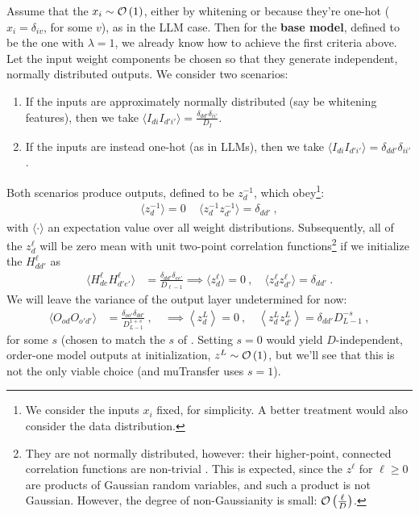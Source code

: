 Assume that the $ x _{i  } \sim \mathcal{O} \left( 1 \right)  $, either by whitening or because they're
one-hot ($ x_{ i }=\delta_{ iv } $, for some $ v $), as in the LLM case. Then for the \textbf{base
model}, defined to be the one with $ \lambda =1 $, we already know how to achieve the first criteria
above. Let the input weight components be chosen so that they generate independent, normally
distributed outputs. We consider two scenarios:
\begin{enumerate}
    \item If the inputs are approximately normally distributed (say be whitening
        features), then we take $ \langle  I_{ d i }I_{ d'i' } \rangle  =  \frac{ \delta_{ dd'
        }\delta _{ ii' } }{ D_{ I } } $.
    \item If the inputs are instead one-hot (as in LLMs), then we take $ \langle  I_{ d i
        }I_{ d'i' } \rangle  =   \delta_{ dd' }\delta _{ ii' } $.
\end{enumerate}
Both scenarios produce outputs, defined to be $ z^{ -1 }_{ d } $, which obey\footnote{We consider
the inputs $ x_{ i } $ fixed, for simplicity. A better treatment would also consider the data
distribution.}:
\begin{align}
    \langle z^{  -1 }_{ d } \rangle=0 \, \quad  \langle z^{  -1 }_{ d }z^{ -1 }_{ d'} \rangle  = \delta_{ dd' }\ ,
\end{align}
with $ \langle \cdot  \rangle $ an expectation value over all weight distributions. Subsequently,
all of the $ z^{ \ell }_{ d } $ will be zero mean with unit two-point correlation
functions\footnote{They are not normally distributed, however: their higher-point, connected
    correlation functions are non-trivial \cite{physicalDL}. This is expected, since the $ z^{ \ell
    }  $ for $ \ell \ge 0 $ are products of Gaussian random variables, and such a product is not
Gaussian. However, the degree of non-Gaussianity is small: $ \mathcal{O} \left( \frac{ \ell }{ D } \right)
$.} if we initialize the $ H^{ \ell }_{ dd' } $ as
\begin{align}
    \langle H^{ \ell }_{ de }H^{ \ell }_{ d'e' } \rangle &=\frac{ \delta _{ dd' }\delta _{ ee' } }{
    D_{ \ell-1 } } \implies \langle z^{\ell}_{ d } \rangle =0 \ , \quad \langle z^{\ell}_{ d }z^{ \ell }_{ d'} \rangle  = \delta_{ dd' } \ .
\end{align}
We will leave the variance of the output layer undetermined for now:
\begin{align}
    \langle O _{ od }O_{ o'd' } \rangle &= \frac{ \delta _{ oo' }\delta _{ dd' } }{ D_{ L-1 }^{ 1+s } }
    \ , \quad \implies \left\langle z^{ L }_{ d } \right\rangle= 0 \ , \quad \left\langle z^{ L }_{ d }z^{ L }_{ d' } \right\rangle= \delta_{ dd' }D_{ L-1 }^{ -s } \ ,
\end{align}
for some $ s $ (chosen to match the $ s $ of
\cite{yaida2022metaprincipledfamilyhyperparameterscaling}. Setting $ s=0 $ would yield $ D
$-independent,  order-one model outputs at initialization, $ z^{ L }\sim \mathcal{O} \left( 1 \right)  $,
but we'll see that this is not the only viable choice (and muTransfer uses $ s=1 $).

